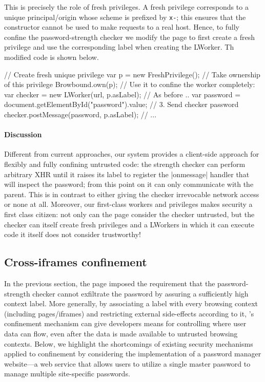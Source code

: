 This is precisely the role of fresh privileges.
%
A fresh privilege corresponds to a unique principal/origin whose
scheme is prefixed by \texttt{x-}; this ensures that the \xhr{}
constructor cannot be used to make requests to a real host.
%
Hence, to fully confine the password-strength checker we modify the
 page to first create a fresh privilege and use the
corresponding label when creating the LWorker.
%
Th modified code is shown below.
\begin{jscode}
// Create fresh unique privilege
var p = new FreshPrivilege();
// Take ownership of this privilege
Browbound.own(p);
// Use it to confine the worker completely:
var checker = new LWorker(url, p.asLabel);
// As before ..
var password = 
 document.getElementById("password").value;
// 3. Send checker password 
checker.postMessage(password, p.asLabel);
// ...
\end{jscode}

\paragraph{Discussion}
Different from current approaches, our system provides a client-side
approach for flexibly and fully confining untrusted code:
%
the strength checker can perform arbitrary XHR until it raises its
label to register the \js|onmessage| handler that will inspect the
password; from this point on it can only communicate with the parent.
%
This is in contrast to either giving the checker irrevocable network
access or none at all.
%
Moreover, our first-class workers and privileges makes security a
first class citizen: not only can the page consider the checker
untrusted, but the checker can itself create fresh privileges and a
LWorkers in which it can execute code it itself does not consider
trustworthy!

\subsection{Cross-iframes confinement}
\label{sec:system:iframe}

In the previous section, the  page imposed the
requirement that the password-strength checker
cannot exfiltrate the password by assuring a sufficiently high context label.  
%
More generally, by associating a label with every browsing context
(including pages/iframes) and restricting external side-effects
according to it, \sys{}'s confinement mechanism can give developers means
for controlling where user data can flow, even after the data is made
available to untrusted browsing contexts.
%
Below, we highlight the shortcomings of existing security mechanisms applied to 
confinement 
by considering the implementation of a password manager website---a web service
that allows users to utilize a single master password to manage multiple
site-specific passwords.%

